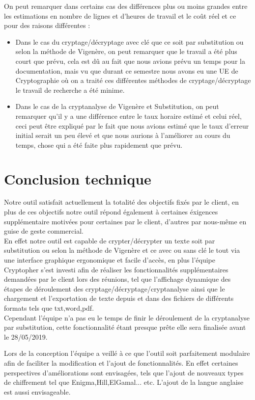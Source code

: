 \documentclass[11pt]{article}
\begin{document}
\begin{enumerate}
On peut remarquer dans certains cas des différences plus ou moins grandes entre les estimations en nombre de lignes et d'heures de travail et le coût réel et ce pour des raisons différentes :
\begin{itemize}[label=\textbullet]
\item Dans le cas du cryptage/décryptage avec clé que ce soit par substitution ou selon la méthode de Vigenère, on peut remarquer que le travail a été plus court que prévu, cela est dû au fait que nous avions prévu un temps pour la documentation, mais vu que durant ce semestre nous avons eu une UE de Cryptographie où on a traité ces différentes méthodes de cryptage/décryptage le travail de recherche a été minime.  
\item Dans le cas de la cryptanalyse de Vigenère et Substitution, on peut remarquer qu'il y a une différence entre le taux horaire estimé et celui réel, ceci peut être expliqué par le fait que nous avions estimé que le taux d'erreur initial serait un peu élevé et que nous aurions à l'améliorer au cours du temps, chose qui a été faite plus rapidement que prévu. 

\end{itemize}

\section{Conclusion technique}
Notre outil satisfait actuellement la totalité des objectifs fixés par le client, en plus de ces objectifs notre outil répond également à certaines éxigences supplémentaire motivées pour certaines par le client, d'autres par nous-même en guise de geste commercial. \\
En effet notre outil est capable de crypter/décrypter un texte soit par substitution ou selon la méthode de Vigenère et ce avec ou sans clé le tout via une interface graphique ergonomique et facile d'accès, en plus l'équipe Cryptopher s'est investi afin de réaliser les fonctionnalités supplémentaires demandées par le client lors des réunions, tel que l'affichage dynamique des étapes de déroulement des cryptage/décryptage/cryptanalyse ainsi que le chargement et l'exportation de texte depuis et dans des fichiers de différents formats tels que txt,word,pdf. \\
Cependant l'équipe n'a pas eu le temps de finir le déroulement de la cryptanalyse par substitution, cette fonctionnalité étant presque prête elle sera finalisée avant le 28/05/2019.

Lors de la conception l'équipe a veillé à ce que l'outil soit parfaitement modulaire afin de faciliter la modification et l'ajout de fonctionnalités.
En effet certaines perspectives d'améliorations sont envisagées, tels que l'ajout de nouveaux types de chiffrement tel que Enigma,Hill,ElGamal... etc.
L'ajout de la langue anglaise est aussi envisageable.

\end{enumerate}
\end{document}
